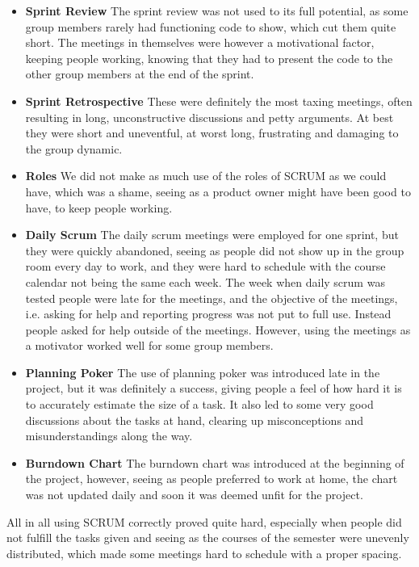 \begin{itemize}
	\item \textbf{Sprint Review} The sprint review was not used to its full potential, as some group members rarely had
	functioning code to show, which cut them quite short. The meetings in themselves were however a motivational factor, keeping
	people working, knowing that they had to present the code to the other group members at  the end of the sprint.
	
	\item \textbf{Sprint Retrospective} These were definitely the most taxing meetings, often resulting in long, unconstructive
	discussions and petty arguments. At best they were short and uneventful, at worst long, frustrating and damaging to the
	group dynamic.
	
	\item \textbf{Roles} We did not make as much use of the roles of SCRUM as we could have, which was a shame, seeing as a
	product owner might have been good to have, to keep people working.
	
	\item \textbf{Daily Scrum} The daily scrum meetings were employed for one sprint, but they were quickly abandoned, seeing
	as people did not show up in the group room every day to work, and they were hard to schedule with the course calendar not
	being the same each week. The week when daily scrum was tested people were late for the meetings, and the objective of the
	meetings, i.e. asking for help and reporting progress was not put to full use. Instead people asked for help outside of the
	meetings. However, using the meetings as a motivator worked well for some group members.
	
	\item \textbf{Planning Poker} The use of planning poker was introduced late in the project, but it was definitely a success,
	giving people a feel of how hard it is to accurately estimate the size of a task. It also led to some very good discussions
	about the tasks at hand, clearing up misconceptions and misunderstandings along the way. 
	
	\item \textbf{Burndown Chart} The burndown chart was introduced at the beginning of the project, however, seeing as people
	preferred to work at home, the chart was not updated daily and soon it was deemed unfit for the project.
\end{itemize}

All in all using SCRUM correctly proved quite hard, especially when people did not fulfill the tasks given and seeing as the courses of the semester were unevenly distributed, which made some meetings hard to schedule with a proper spacing. 